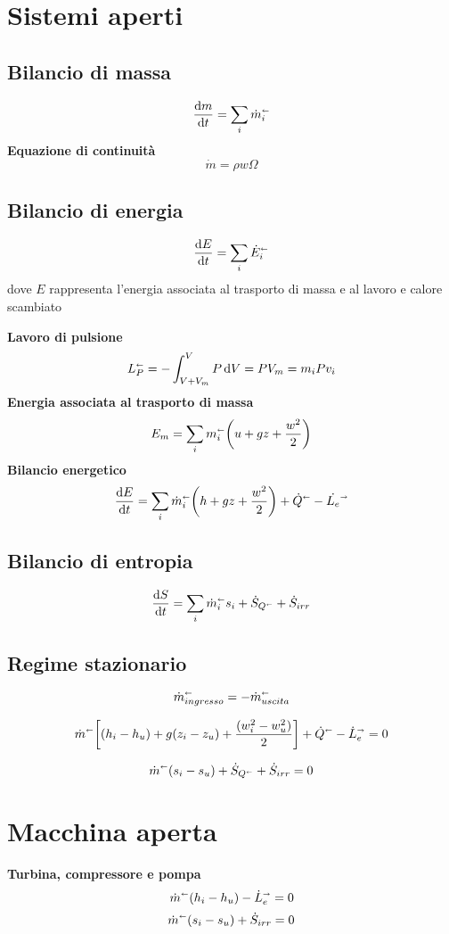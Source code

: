 \section{Sistemi aperti}
\subsection{Bilancio di massa}
\[ \dv{m}{t} = \sum_i \dot{m}_i^\shortleftarrow \]
\textbf{Equazione di continuità} \\
\[ \dot{m} = \rho w \Omega \]

\subsection{Bilancio di energia}
\[ \dv{E}{t} = \sum_i \dot{E}_i^\shortleftarrow \]
dove $E$ rappresenta l'energia associata al trasporto di massa e al lavoro e calore scambiato

\textbf{Lavoro di pulsione} \\
\[ L_P^\shortleftarrow = - \int^{V}_{V+V_m} P\dd{V} = PV_m = m_i P v_i \]
\textbf{Energia associata al trasporto di massa} \\
\[ E_m = \sum_i m_i^\shortleftarrow \qty(u + gz + \frac{w^2}{2}) \]
\textbf{Bilancio energetico} \\
\[ \dv{E}{t} = \sum_i \dot{m}_i^\shortleftarrow \qty(h + gz + \frac{w^2}{2}) + \dot{Q}^\shortleftarrow - \dot{L_e}^\shortrightarrow\]

\subsection{Bilancio di entropia}
\[ \dv{S}{t} = \sum_i \dot{m}_i^\shortleftarrow s_i + \dot{S}_{Q^\shortleftarrow} + \dot{S}_{irr} \]

\subsection{Regime stazionario}
\[ \dot{m}_{ingresso}^\shortleftarrow = -\dot{m}_{uscita}^\shortleftarrow \]

\[ \dot{m}^\shortleftarrow\qty[(h_i - h_u) + g(z_i-z_u) + \frac{(w_i^2-w_u^2)}{2}] + \dot{Q}^\shortleftarrow - \dot{L}_e^\shortrightarrow = 0 \]

\[ \dot{m}^\shortleftarrow (s_i - s_u) + \dot{S}_{Q^\shortleftarrow} + \dot{S}_{irr} = 0 \]

\section{Macchina aperta}
\textbf{Turbina, compressore e pompa}
\[ \dot{m}^\shortleftarrow (h_i - h_u) - \dot{L}_e^\shortrightarrow = 0 \]
\[ \dot{m}^\shortleftarrow (s_i - s_u) + \dot{S}_{irr} = 0 \]

